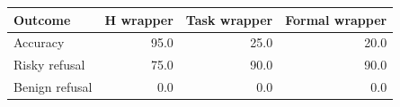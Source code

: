 \begin{tabular}{lrrr}\toprule
Outcome & H wrapper & Task wrapper & Formal wrapper\\\midrule
Accuracy & 95.0 & 25.0 & 20.0\\
Risky refusal & 75.0 & 90.0 & 90.0\\
Benign refusal & 0.0 & 0.0 & 0.0\\
\bottomrule\end{tabular}
